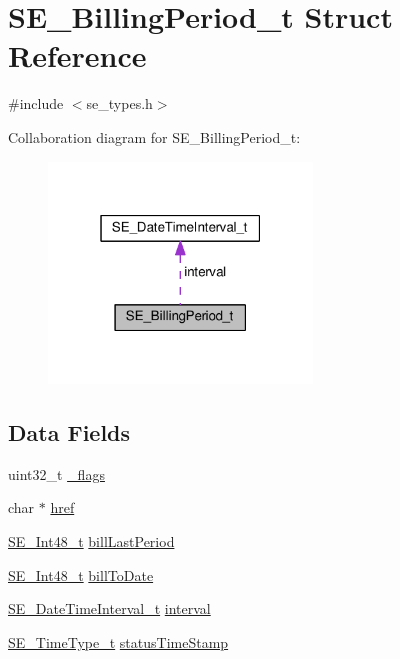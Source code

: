 \hypertarget{structSE__BillingPeriod__t}{}\section{S\+E\+\_\+\+Billing\+Period\+\_\+t Struct Reference}
\label{structSE__BillingPeriod__t}


{\ttfamily \#include $<$se\+\_\+types.\+h$>$}



Collaboration diagram for S\+E\+\_\+\+Billing\+Period\+\_\+t\+:\nopagebreak
\begin{figure}[H]
\begin{center}
\leavevmode
\includegraphics[width=199pt]{structSE__BillingPeriod__t__coll__graph}
\end{center}
\end{figure}
\subsection*{Data Fields}
\begin{DoxyCompactItemize}
\item 
uint32\+\_\+t \hyperlink{group__BillingPeriod_gae6a8b09a63ae09613246632c9d15b670}{\+\_\+flags}
\item 
char $\ast$ \hyperlink{group__BillingPeriod_ga561582b7871962d2bc055f2aca5b524a}{href}
\item 
\hyperlink{group__Int48_ga87620025dc9f6c732fa48fcab95861ce}{S\+E\+\_\+\+Int48\+\_\+t} \hyperlink{group__BillingPeriod_gad93346e423aed2fc21ff583d3496bc27}{bill\+Last\+Period}
\item 
\hyperlink{group__Int48_ga87620025dc9f6c732fa48fcab95861ce}{S\+E\+\_\+\+Int48\+\_\+t} \hyperlink{group__BillingPeriod_ga1f0db8a40f5377696dedbdb02875d386}{bill\+To\+Date}
\item 
\hyperlink{structSE__DateTimeInterval__t}{S\+E\+\_\+\+Date\+Time\+Interval\+\_\+t} \hyperlink{group__BillingPeriod_gaa9c176ad1af5f803fdbaa6aa0e7c7f4c}{interval}
\item 
\hyperlink{group__TimeType_ga6fba87a5b57829b4ff3f0e7638156682}{S\+E\+\_\+\+Time\+Type\+\_\+t} \hyperlink{group__BillingPeriod_ga30652052a4a01d69723c9faf9dd24b29}{status\+Time\+Stamp}
\end{DoxyCompactItemize}


